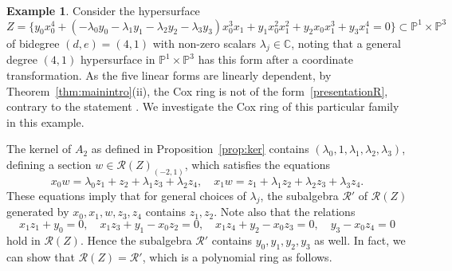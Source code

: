 \documentclass[a4paper,11pt]{amsart}
\theoremstyle{plain}
\theoremstyle{definition}
\newtheorem{example}[theorem]{Example}
\newcommand{\C}{\mathbb{C}}
\newcommand{\p}{\mathbb{P}}
\newcommand{\R}{\mathcal{R}}
\newcommand{\balazs}[1]{{\color{blue} [#1]}}
\newcommand{\atsushi}[1]{{\color{magenta}[#1]}}
\begin{document}
\begin{example}\label{ex:linear}
    Consider the hypersurface 
    \[Z=\{
    y_0 x_0^4 + (-\lambda_0 y_0 -\lambda_1 y_1 -\lambda_2 y_2 -\lambda_3 y_3)x_0^3 x_1 + y_1 x_0^2 x_1^2 + y_2 x_0 x_1^3 + y_3 x_1^4 = 0\}\subset \p^1 \times \p^3
    \]
    of bidegree $(d,e) = (4,1)$ with non-zero scalars $\lambda_j\in\C$, noting that a general degree $(4,1)$ hypersurface in $\p^1 \times \p^3$ has this form after a coordinate transformation.
    As the five linear forms are linearly dependent, by Theorem~\ref{thm:mainintro}(ii), the Cox ring is not of the form~\eqref{presentationR}, contrary to the statement \cite[Thm.1.1(iv)]{ottem}. We investigate the Cox ring of this particular family in this example. 


The kernel of $A_2$ as defined in Proposition~\ref{prop:ker} contains $(\lambda_0,1,\lambda_1,\lambda_2,\lambda_3)$, defining a section $w \in \R(Z)_{(-2,1)}$,
which satisfies the equations
\begin{equation}\label{eq:linear}
       x_0 w = \lambda_0 z_1 + z_2 +\lambda_1 z_3 +\lambda_2 z_4, \quad x_1 w = z_1 + \lambda_1 z_2+ \lambda_2 z_3 +\lambda_3 z_4  .
\end{equation}
    These equations
    imply that for general choices of $\lambda_j$, 
    the subalgebra $\R'$ of $\R(Z)$ generated by $x_0, x_1,w,z_3,z_4$ contains $z_1, z_2$.
Note also that the relations
\[
x_1 z_1 + y_0=0, \quad x_1 z_3 + y_1 - x_0 z_2=0, \quad x_1 z_4 + y_2 - x_0 z_3=0,\quad y_3 - x_0 z_4=0
\]
hold in $\R(Z)$.  %
Hence the subalgebra $\R'$ contains $y_0, y_1,y_2,y_3$ as well.
In fact, we can show that $\R(Z)=\R'$, which is a polynomial ring as follows.


\end{example}
\end{document}
